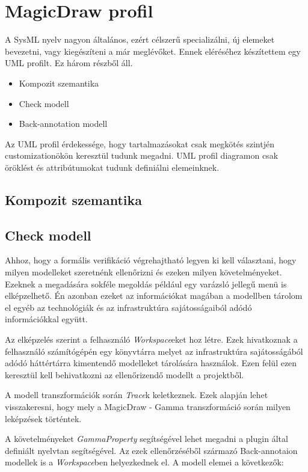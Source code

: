 \section{MagicDraw profil}

A SysML nyelv nagyon általános, ezért célszerű specializálni, új elemeket bevezetni, vagy kiegészíteni a már meglévőket. Ennek eléréséhez készítettem egy UML profilt. Ez három részből áll.

\begin{itemize}
	\item Kompozit szemantika
	\item Check modell
	\item Back-annotation modell
\end{itemize}
Az UML profil érdekessége, hogy tartalmazásokat csak megkötés szintjén customizationökön keresztül tudunk megadni. UML profil diagramon csak öröklést és attribútumokat tudunk definiálni elemeinknek.

\subsection{Kompozit szemantika}

\newpage

\subsection{Check modell}

Ahhoz, hogy a formális verifikáció végrehajtható legyen ki kell választani, hogy milyen modelleket szeretnénk ellenőrizni és ezeken milyen követelményeket. Ezeknek a megadására sokféle megoldás például egy varázsló jellegű menü is elképzelhető. Én azonban ezeket az információkat magában a modellben tárolom el egyéb az technológiák és az infrastruktúra sajátosságaiból adódó információkkal együtt.

Az elképzelés szerint a felhasználó \emph{Workspace}eket hoz létre. Ezek hivatkoznak a felhasználó számítógépén egy könyvtárra melyet az infrastruktúra sajátosságából adódó háttértárra kimentendő modelleket tárolására használok. Ezen felül ezen keresztül kell behivatkozni az ellenőrizendő modellt a projektből.

A modell transzformációk során \emph{Trace}k keletkeznek. Ezek alapján lehet visszakeresni, hogy mely a MagicDraw - Gamma transzformáció során milyen leképzések történtek.

A követelményeket \emph{GammaProperty} segítségével lehet megadni a plugin által definiált nyelvtan segítségével. Az ezek ellenőrzéséből származó Back-annotaion modellek is a \emph{Workspace}ben helyezkednek el. A modell elemei a következők:


